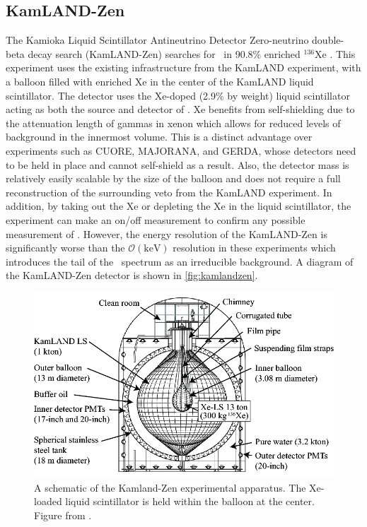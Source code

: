 \subsection{KamLAND-Zen}
The Kamioka Liquid Scintillator Antineutrino Detector Zero-neutrino double-beta decay search (KamLAND-Zen) searches for \zeronubb~in 90.8\% enriched $^{136}$Xe \cite{KamLAND-Zen:2016pfg}.
This experiment uses the existing infrastructure from the KamLAND experiment, with a balloon filled with enriched Xe in the center of the KamLAND liquid scintillator.
The detector uses the Xe-doped (2.9\% by weight) liquid scintillator acting as both the source and detector of \zeronubb.
Xe benefits from self-shielding due to the attenuation length of gammas in xenon which allows for reduced levels of background in the innermost volume.
This is a distinct advantage over experiments such as CUORE, MAJORANA, and GERDA, whose detectors need to be held in place and cannot self-shield as a result.
Also, the detector mass is relatively easily scalable by the size of the balloon and does not require a full reconstruction of the surrounding veto from the KamLAND experiment.
In addition, by taking out the Xe or depleting the Xe in the liquid scintillator, the experiment can make an on/off measurement to confirm any possible measurement of \zeronubb. 
However, the energy resolution of the KamLAND-Zen is significantly worse than the $\mathcal{O}(\textrm{keV})$ resolution in these experiments which introduces the tail of the \twonubb~spectrum as an irreducible background.
A diagram of the KamLAND-Zen detector is shown in \autoref{fig:kamlandzen}.
\begin{figure}[tbph]
\centering
\includegraphics[width=0.7\linewidth]{Figures/KamlandZen}
\caption[A schematic of the Kamland-Zen experimental apparatus]
{A schematic of the Kamland-Zen experimental apparatus.
The Xe-loaded liquid scintillator is held within the balloon at the center.
Figure from \cite{::2015uaa}.}
\label{fig:kamlandzen}
\end{figure}

